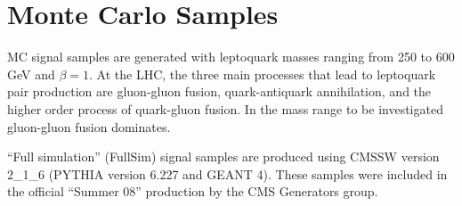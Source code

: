 
%

\section{Monte Carlo Samples} \label{sec:MCSamples}



MC signal samples are generated with leptoquark masses ranging from 250 to 600 GeV and $\beta=1$. 
At the LHC, the three main processes that lead to leptoquark pair production are gluon-gluon fusion, 
quark-antiquark annihilation, and the higher order process of quark-gluon fusion. In the mass range to be investigated gluon-gluon fusion dominates. 

``Full simulation'' (FullSim) signal samples are produced using 
CMSSW version 2\_1\_6 (PYTHIA version 6.227 and GEANT 4). 
These samples were included in the official ``Summer 08'' production by the CMS Generators group.

